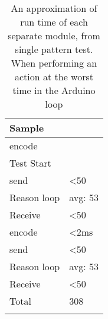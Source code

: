 \begin{center}
	\begin{table}[htbp]
	  \centering
	  \begin{tabular}{l | l}
		\toprule
		Sample  		& 			\\ \midrule
		encode 			& 		  	\\
		Test Start		&			\\
		send   			& <50  		\\
		Reason loop 	& avg: 53 	\\
		Receive 		& <50  		\\
		encode 			& <2ms  	\\
		send   			& <50  		\\
		Reason loop 	& avg: 53 	\\
		Receive 		& <50  		\\
		Total			& 308		\\
									\\ \bottomrule
	  \end{tabular}
	  \caption[Single pattern test, worst case]{An approximation of run time of each separate module, from single pattern test. When performing an action at the worst time in the Arduino loop}
	\end{table}
 \label{Table:WorstRunTimeAprox}
\end{center}
